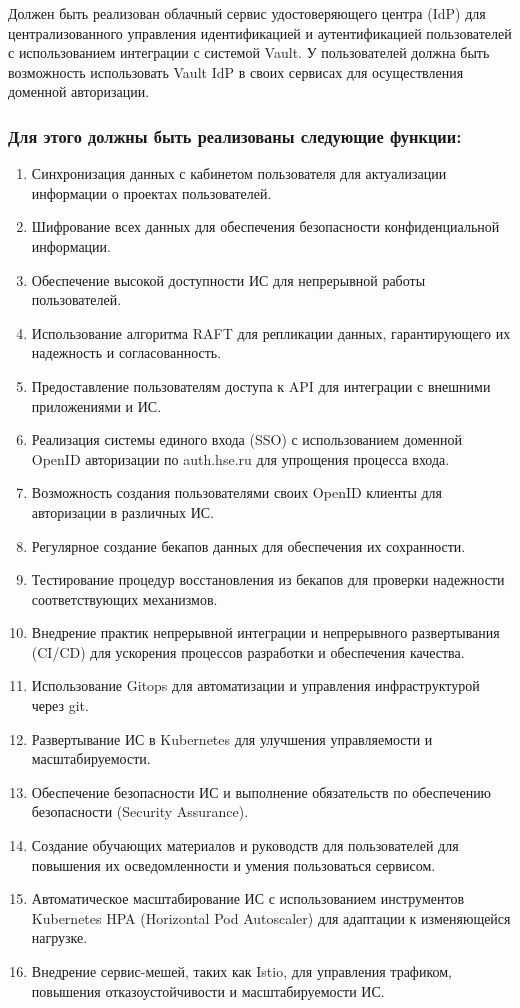 \documentclass[14pt, a4paper]{extarticle}
\begin{document}
Должен быть реализован облачный сервис удостоверяющего центра (IdP) для централизованного управления идентификацией и аутентификацией пользователей с использованием интеграции с системой Vault.
У пользователей должна быть возможность использовать Vault IdP в своих сервисах для осуществления доменной авторизации.

\subsubsection*{Для этого должны быть реализованы следующие функции:}

\begin{enumerate}
\item Синхронизация данных с кабинетом пользователя для актуализации информации о проектах пользователей.
\item Шифрование всех данных для обеспечения безопасности конфиденциальной информации.
\item Обеспечение высокой доступности ИС для непрерывной работы пользователей.
\item Использование алгоритма RAFT для репликации данных, гарантирующего их надежность и согласованность.
\item Предоставление пользователям доступа к API для интеграции с внешними приложениями и ИС.
\item Реализация системы единого входа (SSO) с использованием доменной OpenID авторизации по auth.hse.ru для упрощения процесса входа.
\item Возможность создания пользователями своих OpenID клиенты для авторизации в различных ИС.
\item Регулярное создание бекапов данных для обеспечения их сохранности.
\item Тестирование процедур восстановления из бекапов для проверки надежности соответствующих механизмов.
\item Внедрение практик непрерывной интеграции и непрерывного развертывания (CI/CD) для ускорения процессов разработки и обеспечения качества.
\item Использование Gitops для автоматизации и управления инфраструктурой через git.
\item Развертывание ИС в Kubernetes для улучшения управляемости и масштабируемости.
\item Обеспечение безопасности ИС и выполнение обязательств по обеспечению безопасности (Security Assurance).
\item Создание обучающих материалов и руководств для пользователей для повышения их осведомленности и умения пользоваться сервисом.
\item Автоматическое масштабирование ИС с использованием инструментов Kubernetes HPA (Horizontal Pod Autoscaler) для адаптации к изменяющейся нагрузке.
\item Внедрение сервис-мешей, таких как Istio, для управления трафиком, повышения отказоустойчивости и масштабируемости ИС.
\end{enumerate}
\end{document}
